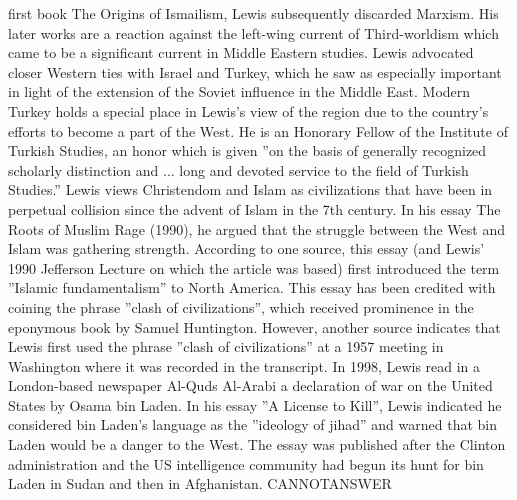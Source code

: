 \documentclass[11pt,a4paper, onecolumn]{article}
\begin{document}
first book The Origins of Ismailism, Lewis subsequently discarded Marxism. His later works are a reaction against the left-wing current of Third-worldism which came to be a significant current in Middle Eastern studies. Lewis advocated closer Western ties with Israel and Turkey, which he saw as especially important in light of the extension of the Soviet influence in the Middle East. Modern Turkey holds a special place in Lewis's view of the region due to the country's efforts to become a part of the West. He is an Honorary Fellow of the Institute of Turkish Studies, an honor which is given ''on the basis of generally recognized scholarly distinction and ... long and devoted service to the field of Turkish Studies.'' Lewis views Christendom and Islam as civilizations that have been in perpetual collision since the advent of Islam in the 7th century. In his essay The Roots of Muslim Rage (1990), he argued that the struggle between the West and Islam was gathering strength. According to one source, this essay (and Lewis' 1990 Jefferson Lecture on which the article was based) first introduced the term ''Islamic fundamentalism'' to North America. This essay has been credited with coining the phrase ''clash of civilizations'', which received prominence in the eponymous book by Samuel Huntington. However, another source indicates that Lewis first used the phrase ''clash of civilizations'' at a 1957 meeting in Washington where it was recorded in the transcript. In 1998, Lewis read in a London-based newspaper Al-Quds Al-Arabi a declaration of war on the United States by Osama bin Laden. In his essay ''A License to Kill'', Lewis indicated he considered bin Laden's language as the ''ideology of jihad'' and warned that bin Laden would be a danger to the West. The essay was published after the Clinton administration and the US intelligence community had begun its hunt for bin Laden in Sudan and then in Afghanistan. CANNOTANSWER
\end{document}
